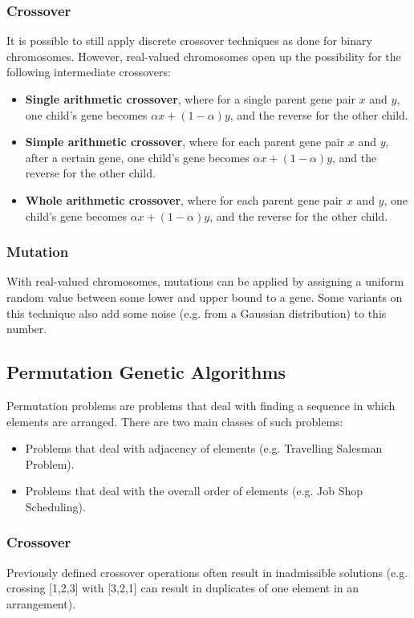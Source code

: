 \documentclass[12pt,titlepage]{article}
\begin{document}
      \subsubsection{Crossover}
        It is possible to still apply discrete crossover techniques as done for binary chromosomes. However, real-valued chromosomes open up the possibility for the following
        intermediate crossovers:
        \begin{itemize}
          \item \textbf{Single arithmetic crossover}, where for a single parent gene pair $x$ and $y$, one child's gene becomes $\alpha x + (1 - \alpha) y$, and the reverse for the other child. 
          \item \textbf{Simple arithmetic crossover}, where for each parent gene pair $x$ and $y$, after a certain gene, one child's gene becomes $\alpha x + (1 - \alpha) y$, and the reverse
            for the other child. 
          \item \textbf{Whole arithmetic crossover}, where for each parent gene pair $x$ and $y$, one child's gene becomes $\alpha x + (1 - \alpha) y$, and the reverse for the other child.
        \end{itemize}

      \subsubsection{Mutation}
        With real-valued chromosomes, mutations can be applied by assigning a uniform random value between some lower and upper bound to a gene. Some variants on this technique also
        add some noise (e.g. from a Gaussian distribution) to this number.

    \subsection{Permutation Genetic Algorithms}
      Permutation problems are problems that deal with finding a sequence in which elements are arranged. There are two main classes of such problems:
      \begin{itemize}
        \item Problems that deal with adjacency of elements (e.g. Travelling Salesman Problem).
        \item Problems that deal with the overall order of elements (e.g. Job Shop Scheduling).
      \end{itemize}

      \subsubsection{Crossover}
        Previously defined crossover operations often result in inadmissible solutions (e.g. crossing [1,2,3] with [3,2,1] can result in duplicates of one element in an arrangement).
\end{document}
